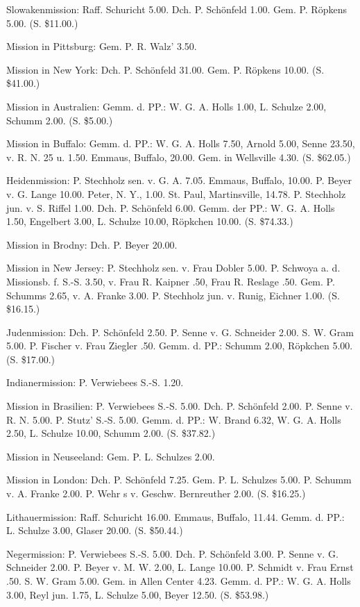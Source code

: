 Slowakenmission: Raff. Schuricht 5.00. Dch. P. Schönfeld 1.00. Gem. P. Röpkens 5.00. (S. \$11.00.)

Mission in Pittsburg: Gem. P. R. Walz’ 3.50.

Mission in New York: Dch. P. Schönfeld 31.00. Gem. P. Röpkens 10.00. (S. \$41.00.)

Mission in Australien: Gemm. d. PP.: W. G. A. Holls 1.00, L. Schulze 2.00, Schumm 2.00. (S. \$5.00.)

Mission in Buffalo: Gemm. d. PP.: W. G. A. Holls 7.50, Arnold 5.00, Senne 23.50, v. R. N. 25 u. 1.50. Emmaus, Buffalo, 20.00. Gem. in Wellsville 4.30. (S. \$62.05.)

Heidenmission: P. Stechholz sen. v. G. A. 7.05. Emmaus, Buffalo, 10.00. P. Beyer v. G. Lange 10.00. Peter, N. Y., 1.00. St. Paul, Martinsville, 14.78. P. Stechholz jun. v. S. Riffel 1.00. Dch. P. Schönfeld 6.00. Gemm. der PP.: W. G. A. Holls 1.50, Engelbert 3.00, L. Schulze 10.00, Röpkchen 10.00. (S. \$74.33.)

Mission in Brodny: Dch. P. Beyer 20.00.

Mission in New Jersey: P. Stechholz sen. v. Frau Dobler 5.00. P. Schwoya a. d. Missionsb. f. S.-S. 3.50, v. Frau R. Kaipner .50, Frau R. Reslage .50. Gem. P. Schumms 2.65, v. A. Franke 3.00. P. Stechholz jun. v. Runig, Eichner 1.00. (S. \$16.15.)

Judenmission: Dch. P. Schönfeld 2.50. P. Senne v. G. Schneider 2.00. S. W. Gram 5.00. P. Fischer v. Frau Ziegler .50. Gemm. d. PP.: Schumm 2.00, Röpkchen 5.00. (S. \$17.00.)

Indianermission: P. Verwiebees S.-S. 1.20.

Mission in Brasilien: P. Verwiebees S.-S. 5.00. Dch. P. Schönfeld 2.00. P. Senne v. R. N. 5.00. P. Stutz’ S.-S. 5.00. Gemm. d. PP.: W. Brand 6.32, W. G. A. Holls 2.50, L. Schulze 10.00, Schumm 2.00. (S. \$37.82.)

Mission in Neuseeland: Gem. P. L. Schulzes 2.00.

Mission in London: Dch. P. Schönfeld 7.25. Gem. P. L. Schulzes 5.00. P. Schumm v. A. Franke 2.00. P. Wehr s v. Geschw. Bernreuther 2.00. (S. \$16.25.)

Lithauermission: Raff. Schuricht 16.00. Emmaus, Buffalo, 11.44. Gemm. d. PP.: L. Schulze 3.00, Glaser 20.00. (S. \$50.44.)

Negermission: P. Verwiebees S.-S. 5.00. Dch. P. Schönfeld 3.00. P. Senne v. G. Schneider 2.00. P. Beyer v. M. W. 2.00, L. Lange 10.00. P. Schmidt v. Frau Ernst .50. S. W. Gram 5.00. Gem. in Allen Center 4.23. Gemm. d. PP.: W. G. A. Holls 3.00, Reyl jun. 1.75, L. Schulze 5.00, Beyer 12.50. (S. \$53.98.)

